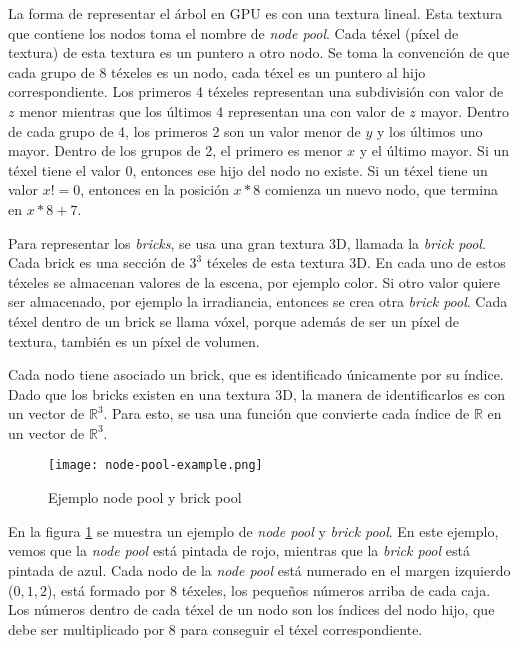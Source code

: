 La forma de representar el árbol en GPU es con una textura lineal.
Esta textura que contiene los nodos toma el nombre de \textit{node pool}.
Cada téxel (píxel de textura) de esta textura es un puntero a otro nodo.
Se toma la convención de que cada grupo de 8 téxeles es un nodo, cada téxel es un puntero al hijo correspondiente.
Los primeros 4 téxeles representan una subdivisión con valor de $z$ menor mientras que los últimos 4 representan una con valor de $z$ mayor.
Dentro de cada grupo de 4, los primeros 2 son un valor menor de $y$ y los últimos uno mayor.
Dentro de los grupos de 2, el primero es menor $x$ y el último mayor.
Si un téxel tiene el valor $0$, entonces ese hijo del nodo no existe.
Si un téxel tiene un valor $x != 0$, entonces en la posición $x * 8$ comienza un nuevo nodo, que termina en $x * 8 + 7$.

Para representar los \textit{bricks}, se usa una gran textura 3D, llamada la \textit{brick pool}.
Cada brick es una sección de $3^3$ téxeles de esta textura 3D.
En cada uno de estos téxeles se almacenan valores de la escena, por ejemplo color.
Si otro valor quiere ser almacenado, por ejemplo la irradiancia, entonces se crea otra \textit{brick pool}.
Cada téxel dentro de un brick se llama vóxel, porque además de ser un píxel de textura, también es un píxel de volumen.

Cada nodo tiene asociado un brick, que es identificado únicamente por su índice.
Dado que los bricks existen en una textura 3D, la manera de identificarlos es con un vector de $\mathbb{R}^3$.
Para esto, se usa una función que convierte cada índice de $\mathbb{R}$ en un vector de $\mathbb{R}^3$.

\begin{figure}[h!]
    \centering
    \texttt{[image: node-pool-example.png]}
    \caption{Ejemplo node pool y brick pool}
    \label{fig:node_pool_example}
\end{figure}

En la figura \ref{fig:node_pool_example} se muestra un ejemplo de \textit{node pool} y \textit{brick pool}.
En este ejemplo, vemos que la \textit{node pool} está pintada de rojo, mientras que la \textit{brick pool} está pintada de azul.
Cada nodo de la \textit{node pool} está numerado en el margen izquierdo ($0, 1, 2$), está formado por $8$ téxeles, los pequeños números arriba de cada caja.
Los números dentro de cada téxel de un nodo son los índices del nodo hijo, que debe ser multiplicado por $8$ para conseguir el téxel correspondiente.

